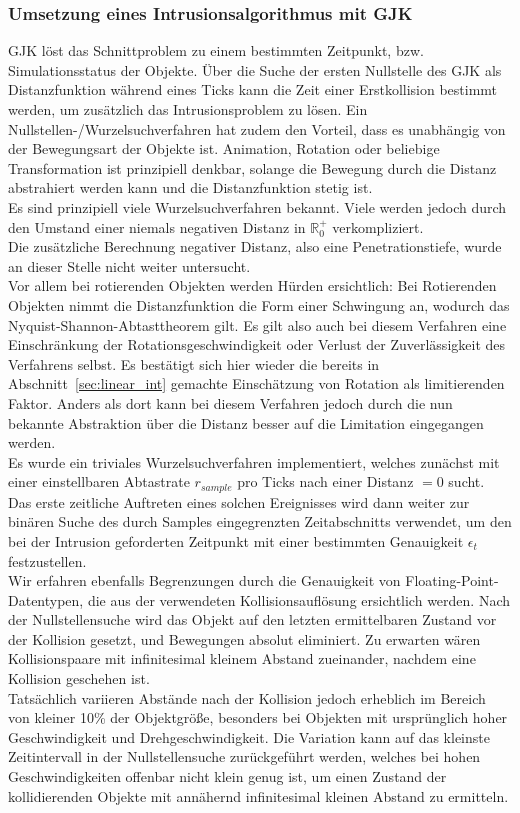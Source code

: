 \subsubsection{Umsetzung eines Intrusionsalgorithmus mit GJK}
GJK löst das Schnittproblem zu einem bestimmten Zeitpunkt, bzw. Simulationsstatus der Objekte. Über die Suche der ersten Nullstelle des GJK als Distanzfunktion während eines Ticks kann die Zeit einer Erstkollision bestimmt werden, um zusätzlich das Intrusionsproblem zu lösen.
Ein Nullstellen-/Wurzelsuchverfahren hat zudem den Vorteil, dass es unabhängig von der Bewegungsart der Objekte ist. Animation, Rotation oder beliebige Transformation ist prinzipiell denkbar, solange die Bewegung durch die Distanz abstrahiert werden kann und die Distanzfunktion stetig ist.\\
Es sind prinzipiell viele Wurzelsuchverfahren bekannt. Viele werden jedoch durch den Umstand einer niemals negativen Distanz in $\mathbb{R}^+_0$ verkompliziert.\\
Die zusätzliche Berechnung negativer Distanz, also eine Penetrationstiefe, wurde an dieser Stelle nicht weiter untersucht.\\
Vor allem bei rotierenden Objekten werden Hürden ersichtlich:
Bei Rotierenden Objekten nimmt die Distanzfunktion die Form einer Schwingung an, wodurch das Nyquist-Shannon-Abtasttheorem \cite{nyquist} gilt. Es gilt also auch bei diesem Verfahren eine Einschränkung der Rotationsgeschwindigkeit oder Verlust der Zuverlässigkeit des Verfahrens selbst. Es bestätigt sich hier wieder die bereits in Abschnitt~\ref{sec:linear_int} gemachte Einschätzung von Rotation als limitierenden Faktor. Anders als dort kann bei diesem Verfahren jedoch durch die nun bekannte Abstraktion über die Distanz besser auf die Limitation eingegangen werden.\\
Es wurde ein triviales Wurzelsuchverfahren implementiert, welches zunächst mit einer einstellbaren Abtastrate $r_{sample}$  pro Ticks nach einer Distanz $= 0$ sucht. Das erste zeitliche Auftreten eines solchen Ereignisses wird dann weiter zur binären Suche des durch Samples eingegrenzten Zeitabschnitts verwendet, um den bei der Intrusion geforderten Zeitpunkt mit einer bestimmten Genauigkeit $\epsilon_t$ festzustellen.\\
Wir erfahren ebenfalls Begrenzungen durch die Genauigkeit von Floating-Point-Datentypen, die aus der verwendeten Kollisionsauflösung ersichtlich werden. Nach der Nullstellensuche wird das Objekt auf den letzten ermittelbaren Zustand vor der Kollision gesetzt, und Bewegungen absolut eliminiert. Zu erwarten wären Kollisionspaare mit infinitesimal kleinem Abstand zueinander, nachdem eine Kollision geschehen ist.\\
Tatsächlich variieren Abstände nach der Kollision jedoch erheblich im Bereich von kleiner 10\% der Objektgröße, besonders bei Objekten mit ursprünglich hoher Geschwindigkeit und Drehgeschwindigkeit. Die Variation kann auf das kleinste Zeitintervall in der Nullstellensuche zurückgeführt werden, welches bei hohen Geschwindigkeiten offenbar nicht klein genug ist, um einen Zustand der kollidierenden Objekte mit annähernd infinitesimal kleinen Abstand zu ermitteln.\\

